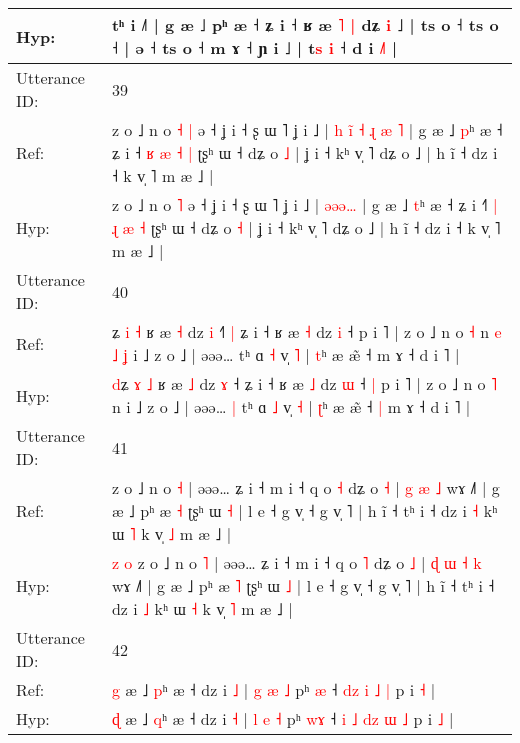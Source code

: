 \documentclass[10pt]{article}
\DeclareRobustCommand{\hl}[1]{{\textcolor{red}{#1}}}
\begin{document}
\begin{longtable}{ll}
 \\
Hyp: & tʰ i ˩˥ | g æ ˩ pʰ æ ˧ ʑ i ˧ ʁ æ\hl{ }\hl{˥} \hl{|} dʑ \hl{i} ˩ | ts o ˧ ts o ˧ | ə ˧ ts o ˧ m ɤ ˧ ɲ i ˩ | t\hl{s} \hl{i} ˧ d i \hl{˩}˥ |
 \\
\midrule
Utterance ID: & 39 \\
Ref: & z o ˩ n o\hl{ }\hl{˧} \hl{|} ə ˧ ʝ i ˧ ʂ ɯ ˥ ʝ i ˩ |\hl{ }\hl{h}\hl{ }\hl{i}\hl{̃}\hl{ }\hl{˧} \hl{ɻ}\hl{ }\hl{æ}\hl{ }\hl{˥} | g æ ˩ \hl{p}ʰ æ ˧ ʑ i ˧\hl{} \hl{ʁ} \hl{æ} \hl{˧} \hl{|} ʈʂʰ ɯ ˧ dʑ o \hl{˩} | ʝ i ˧ kʰ v̩ ˥ dʑ o ˩ | h ĩ ˧ dz i ˧ k v̩ ˥ m æ ˩ |
 \\
Hyp: & z o ˩ n o\hl{}\hl{} \hl{˥} ə ˧ ʝ i ˧ ʂ ɯ ˥ ʝ i ˩ |\hl{}\hl{}\hl{}\hl{}\hl{}\hl{}\hl{} \hl{}\hl{ə}\hl{ə}\hl{ə}\hl{…} | g æ ˩ \hl{t}ʰ æ ˧ ʑ i ˧\hl{˥} \hl{|} \hl{ɻ} \hl{æ} \hl{˧} ʈʂʰ ɯ ˧ dʑ o \hl{˧} | ʝ i ˧ kʰ v̩ ˥ dʑ o ˩ | h ĩ ˧ dz i ˧ k v̩ ˥ m æ ˩ |
 \\
\midrule
Utterance ID: & 40 \\
Ref: & \hl{}ʑ \hl{i} \hl{˧} ʁ æ \hl{˧} dz \hl{i} ˧\hl{˥}\hl{ }\hl{|} ʑ i ˧ ʁ æ \hl{˧} dz \hl{i} ˧\hl{}\hl{} p i ˥ | z o ˩ n o \hl{˧} n\hl{ }\hl{e}\hl{ }\hl{˩}\hl{ }\hl{ʝ} i ˩ z o ˩ | əəə…\hl{}\hl{} tʰ ɑ \hl{˧} v̩ \hl{˥} | \hl{t}ʰ æ æ̃ ˧\hl{}\hl{} m ɤ ˧ d i ˥ |
 \\
Hyp: & \hl{d}ʑ \hl{ɤ} \hl{˩} ʁ æ \hl{˩} dz \hl{ɤ} ˧\hl{}\hl{}\hl{} ʑ i ˧ ʁ æ \hl{˩} dz \hl{ɯ} ˧\hl{ }\hl{|} p i ˥ | z o ˩ n o \hl{˥} n\hl{}\hl{}\hl{}\hl{}\hl{}\hl{} i ˩ z o ˩ | əəə…\hl{ }\hl{|} tʰ ɑ \hl{˩} v̩ \hl{˧} | \hl{ʈ}ʰ æ æ̃ ˧\hl{ }\hl{|} m ɤ ˧ d i ˥ |
 \\
\midrule
Utterance ID: & 41 \\
Ref: & \hl{}\hl{}\hl{}\hl{}z o ˩ n o \hl{˧} | əəə… ʑ i ˧ m i ˧ q o \hl{˧} dʑ o \hl{˧} |\hl{}\hl{} \hl{g} \hl{æ} \hl{˩} wɤ ˩˥ | g æ ˩ pʰ æ \hl{˧} ʈʂʰ ɯ \hl{˧} | l e ˧ g v̩ ˧ g v̩ ˥ | h ĩ ˧ tʰ i ˧ dz i \hl{˧} kʰ ɯ \hl{˥} k v̩ \hl{˩} m æ ˩ |
 \\
Hyp: & \hl{z}\hl{ }\hl{o}\hl{ }z o ˩ n o \hl{˥} | əəə… ʑ i ˧ m i ˧ q o \hl{˥} dʑ o \hl{˩} |\hl{ }\hl{ɖ} \hl{ɯ} \hl{˧} \hl{k} wɤ ˩˥ | g æ ˩ pʰ æ \hl{˥} ʈʂʰ ɯ \hl{˩} | l e ˧ g v̩ ˧ g v̩ ˥ | h ĩ ˧ tʰ i ˧ dz i \hl{˩} kʰ ɯ \hl{˧} k v̩ \hl{˥} m æ ˩ |
 \\
\midrule
Utterance ID: & 42 \\
Ref: & \hl{g} æ ˩ \hl{p}ʰ æ ˧ dz i \hl{˩} | \hl{g} \hl{æ} \hl{˩} pʰ \hl{}\hl{æ} ˧ \hl{}\hl{d}\hl{z} \hl{}\hl{i} \hl{˩} \hl{|} p i \hl{˧} |
 \\
Hyp: & \hl{ɖ} æ ˩ \hl{q}ʰ æ ˧ dz i \hl{˧} | \hl{l} \hl{e} \hl{˧} pʰ \hl{w}\hl{ɤ} ˧ \hl{i}\hl{ }\hl{˩} \hl{d}\hl{z} \hl{ɯ} \hl{˩} p i \hl{˩} |

\end{longtable}
\end{document}
